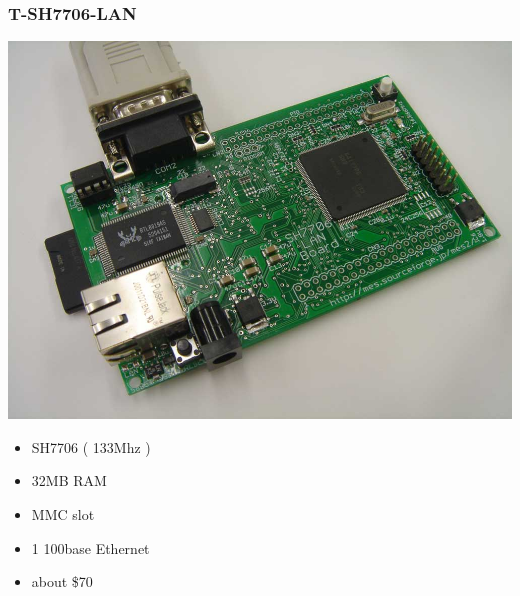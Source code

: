 \documentclass[cjk,dvipdfmx,12pt]{beamer}
\begin{document}
\begin{frame}
 \frametitle{T-SH7706-LAN}
 \begin{minipage}[t]{0.4\hsize}
  \includegraphics[width=1.0\hsize]{image200705/t-sh7706lan.jpg}
 \end{minipage} 
 \begin{minipage}[t]{0.5\hsize}
  \begin{itemize}
   \item SH7706 ( 133Mhz )
   \item 32MB RAM 
   \item MMC slot 
   \item 1 100base Ethernet
   \item about \$70
  \end{itemize}
 \end{minipage}
\end{frame}
\end{document}
